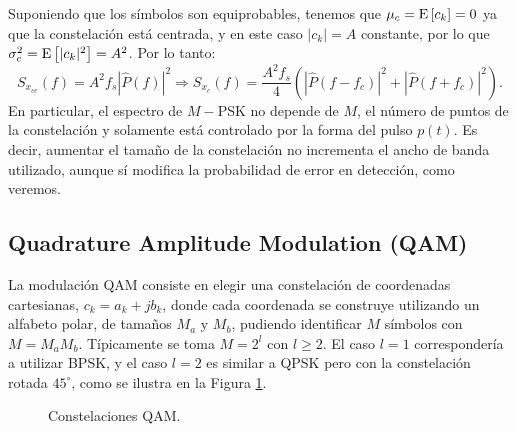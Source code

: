 Suponiendo que los símbolos son equiprobables, tenemos que $\mu_c=\mathrm{E}\left[c_k\right] = 0$ ya que la constelación está centrada, y en este caso $|c_k|=A$ constante, por lo que $\sigma_c^2 = \mathrm{E}\left[|c_k|^2\right] = A^2$. Por lo tanto:
\begin{equation*}
    S_{x_{ce}}(f) = A^2 f_s |\hat{P}(f)|^2 \Longrightarrow S_{x_c}(f) = \frac{A^2 f_s}{4}\left(|\hat{P}(f-f_c)|^2+|\hat{P}(f+f_c)|^2\right).
\end{equation*}
En particular, el espectro de $M-$PSK no depende de $M$, el número de puntos de la constelación y solamente está controlado por la forma del pulso $p(t)$. Es decir, aumentar el tamaño de la constelación no incrementa el ancho de banda utilizado, aunque sí modifica la probabilidad de error en detección, como veremos.

\subsection{Quadrature Amplitude Modulation (QAM)}

La modulación QAM consiste en elegir una constelación de coordenadas cartesianas, $c_k = a_k+j b_k$, donde cada coordenada se construye utilizando un alfabeto polar, de tamaños $M_a$ y $M_b$, pudiendo identificar $M$ símbolos con $M=M_a M_b$. Típicamente se toma $M=2^l$ con $l\geqslant 2$. El caso $l=1$ correspondería a utilizar BPSK, y el caso $l=2$ es similar a QPSK pero con la constelación rotada $45^{\circ}$, como se ilustra en la Figura \ref{fig:qam}.

\begin{figure}
    \begin{center}
    \end{center}
    \caption{Constelaciones QAM.}\label{fig:qam}
\end{figure}

